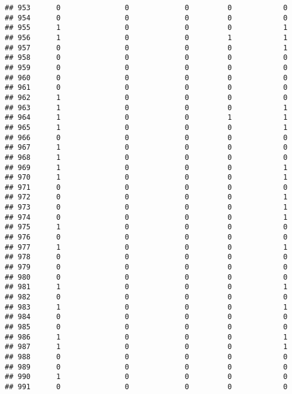 \documentclass[]{article}
\begin{document}
\begin{verbatim}
## 953      0               0             0         0            0
## 954      0               0             0         0            0
## 955      1               0             0         0            1
## 956      1               0             0         1            1
## 957      0               0             0         0            1
## 958      0               0             0         0            0
## 959      0               0             0         0            0
## 960      0               0             0         0            0
## 961      0               0             0         0            0
## 962      1               0             0         0            0
## 963      1               0             0         0            1
## 964      1               0             0         1            1
## 965      1               0             0         0            1
## 966      0               0             0         0            0
## 967      1               0             0         0            0
## 968      1               0             0         0            0
## 969      1               0             0         0            1
## 970      1               0             0         0            1
## 971      0               0             0         0            0
## 972      0               0             0         0            1
## 973      0               0             0         0            1
## 974      0               0             0         0            1
## 975      1               0             0         0            0
## 976      0               0             0         0            0
## 977      1               0             0         0            1
## 978      0               0             0         0            0
## 979      0               0             0         0            0
## 980      0               0             0         0            0
## 981      1               0             0         0            1
## 982      0               0             0         0            0
## 983      1               0             0         0            1
## 984      0               0             0         0            0
## 985      0               0             0         0            0
## 986      1               0             0         0            1
## 987      1               0             0         0            1
## 988      0               0             0         0            0
## 989      0               0             0         0            0
## 990      1               0             0         0            0
## 991      0               0             0         0            0

\end{verbatim}
\end{document}
